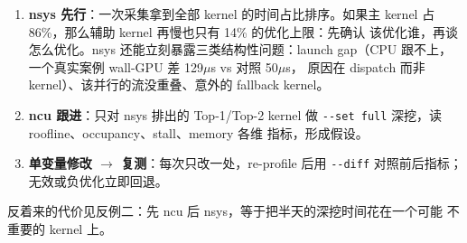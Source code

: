 \begin{enumerate}
\item \textbf{nsys 先行}：一次采集拿到全部 kernel 的时间占比排序。如果主
  kernel 占 86\%，那么辅助 kernel 再慢也只有 14\% 的优化上限：先确认
  该优化谁，再谈怎么优化。nsys 还能立刻暴露三类结构性问题：launch
  gap（CPU 跟不上，一个真实案例 wall-GPU 差 129$\mu$s vs 对照 50$\mu$s，
  原因在 dispatch 而非 kernel）、该并行的流没重叠、意外的 fallback kernel。
\item \textbf{ncu 跟进}：只对 nsys 排出的 Top-1/Top-2 kernel 做
  \texttt{-{}-set full} 深挖，读 roofline、occupancy、stall、memory 各维
  指标，形成假设。
\item \textbf{单变量修改 $\to$ 复测}：每次只改一处，re-profile 后用
  \texttt{-{}-diff} 对照前后指标；无效或负优化立即回退。
\end{enumerate}

反着来的代价见反例二：先 ncu 后 nsys，等于把半天的深挖时间花在一个可能
不重要的 kernel 上。


